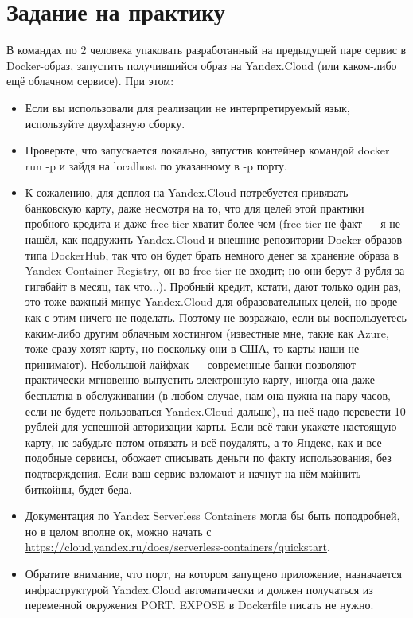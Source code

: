 \documentclass{../../text-style}
\begin{document}
\maketitle
\thispagestyle{empty}

\section{Задание на практику}

В командах по 2 человека упаковать разработанный на предыдущей паре сервис в Docker-образ, запустить получившийся образ на Yandex.Cloud (или каком-либо ещё облачном сервисе). При этом: 

\begin{itemize}
    \item Если вы использовали для реализации не интерпретируемый язык, используйте двухфазную сборку.
    \item Проверьте, что запускается локально, запустив контейнер командой docker run -p и зайдя на localhost по указанному в -p порту.
    \item К сожалению, для деплоя на Yandex.Cloud потребуется привязать банковскую карту, даже несмотря на то, что для целей этой практики пробного кредита и даже free tier хватит более чем (free tier не факт --- я не нашёл, как подружить Yandex.Cloud и внешние репозитории Docker-образов типа DockerHub, так что он будет брать немного денег за хранение образа в Yandex Container Registry, он во free tier не входит; но они берут 3 рубля за гигабайт в месяц, так что...). Пробный кредит, кстати, дают только один раз, это тоже важный минус Yandex.Cloud для образовательных целей, но вроде как с этим ничего не поделать. Поэтому не возражаю, если вы воспользуетесь каким-либо другим облачным хостингом (известные мне, такие как Azure, тоже сразу хотят карту, но поскольку они в США, то карты наши не принимают). Небольшой лайфхак --- современные банки позволяют практически мгновенно выпустить электронную карту, иногда она даже бесплатна в обслуживании (в любом случае, нам она нужна на пару часов, если не будете пользоваться Yandex.Cloud дальше), на неё надо перевести 10 рублей для успешной авторизации карты. Если всё-таки укажете настоящую карту, не забудьте потом отвязать и всё поудалять, а то Яндекс, как и все подобные сервисы, обожает списывать деньги по факту использования, без подтверждения. Если ваш сервис взломают и начнут на нём майнить биткойны, будет беда.
    \item Документация по Yandex Serverless Containers могла бы быть поподробней, но в целом вполне ок, можно начать с \url{https://cloud.yandex.ru/docs/serverless-containers/quickstart}.
    \item Обратите внимание, что порт, на котором запущено приложение, назначается инфраструктурой Yandex.Cloud автоматически и должен получаться из переменной окружения PORT. EXPOSE в Dockerfile писать не нужно.
\end{itemize}
\end{document}
